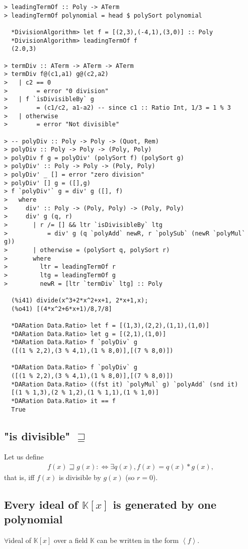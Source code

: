 \documentclass[11pt]{book}
\begin{document}
\begin{verbatim}
> leadingTermOf :: Poly -> ATerm
> leadingTermOf polynomial = head $ polySort polynomial 

  *DivisionAlgorithm> let f = [(2,3),(-4,1),(3,0)] :: Poly 
  *DivisionAlgorithm> leadingTermOf f
  (2.0,3)

> termDiv :: ATerm -> ATerm -> ATerm
> termDiv f@(c1,a1) g@(c2,a2)
>   | c2 == 0             
>        = error "0 division"
>   | f `isDivisibleBy` g 
>        = (c1/c2, a1-a2) -- since c1 :: Ratio Int, 1/3 = 1 % 3
>   | otherwise           
>        = error "Not divisible"

> -- polyDiv :: Poly -> Poly -> (Quot, Rem)
> polyDiv :: Poly -> Poly -> (Poly, Poly)
> polyDiv f g = polyDiv' (polySort f) (polySort g)
> polyDiv' :: Poly -> Poly -> (Poly, Poly)
> polyDiv' _ [] = error "zero division"
> polyDiv' [] g = ([],g)
> f `polyDiv'` g = div' g ([], f)
>   where
>     div' :: Poly -> (Poly, Poly) -> (Poly, Poly)
>     div' g (q, r)
>       | r /= [] && ltr `isDivisibleBy` ltg
>           = div' g (q `polyAdd` newR, r `polySub` (newR `polyMul` g)) 
>       | otherwise = (polySort q, polySort r)
>       where
>         ltr = leadingTermOf r
>         ltg = leadingTermOf g
>         newR = [ltr `termDiv` ltg] :: Poly

  (%i41) divide(x^3+2*x^2+x+1, 2*x+1,x);
  (%o41) [(4*x^2+6*x+1)/8,7/8]

  *DARation Data.Ratio> let f = [(1,3),(2,2),(1,1),(1,0)]
  *DARation Data.Ratio> let g = [(2,1),(1,0)]
  *DARation Data.Ratio> f `polyDiv` g
  ([(1 % 2,2),(3 % 4,1),(1 % 8,0)],[(7 % 8,0)])

  *DARation Data.Ratio> f `polyDiv` g
  ([(1 % 2,2),(3 % 4,1),(1 % 8,0)],[(7 % 8,0)])
  *DARation Data.Ratio> ((fst it) `polyMul` g) `polyAdd` (snd it)
  [(1 % 1,3),(2 % 1,2),(1 % 1,1),(1 % 1,0)]
  *DARation Data.Ratio> it == f
  True
\end{verbatim}

\subsection{"is divisible" $\sqsupseteq$}
Let us define
\begin{eqnarray}
f(x) \sqsupseteq g(x) :\Leftrightarrow \exists q(x), f(x) = q(x) * g(x),
\end{eqnarray}
that is, iff $f(x)$ is divisible by $g(x)$ (so $r=0$).

\subsection{Every ideal of $\mathbb{K}[x]$ is generated by one polynomial}
\label{InOneDimension}
$\forall$ideal of $\mathbb{K}[x]$ over a field $\mathbb{K}$ can be written in the form $\left< f\right>$.
\end{document}
